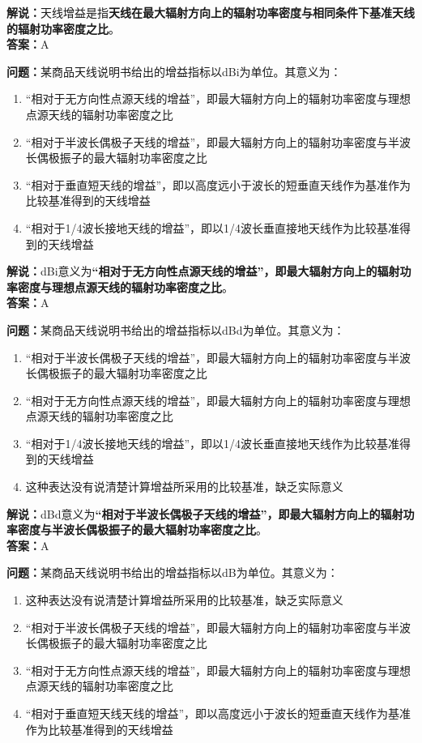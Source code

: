 \textbf{解说：}天线增益是指\textbf{天线在最大辐射方向上的辐射功率密度与相同条件下基准天线的辐射功率密度之比}。\\\textbf{答案：}A



\textbf{问题：}某商品天线说明书给出的增益指标以dBi为单位。其意义为：
\begin{enumerate}[label=\Alph*), leftmargin=1.5cm]
	\item “相对于无方向性点源天线的增益”，即最大辐射方向上的辐射功率密度与理想点源天线的辐射功率密度之比
	\item “相对于半波长偶极子天线的增益”，即最大辐射方向上的辐射功率密度与半波长偶极振子的最大辐射功率密度之比
	\item “相对于垂直短天线的增益”，即以高度远小于波长的短垂直天线作为基准作为比较基准得到的天线增益
	\item “相对于1/4波长接地天线的增益”，即以1/4波长垂直接地天线作为比较基准得到的天线增益
\end{enumerate}

\textbf{解说：}dBi意义为\textbf{“相对于无方向性点源天线的增益”，即最大辐射方向上的辐射功率密度与理想点源天线的辐射功率密度之比}。\\\textbf{答案：}A



\textbf{问题：}某商品天线说明书给出的增益指标以dBd为单位。其意义为：

\begin{enumerate}[label=\Alph*), leftmargin=1.5cm]
	\item “相对于半波长偶极子天线的增益”，即最大辐射方向上的辐射功率密度与半波长偶极振子的最大辐射功率密度之比
	\item “相对于无方向性点源天线的增益”，即最大辐射方向上的辐射功率密度与理想点源天线的辐射功率密度之比
	\item “相对于1/4波长接地天线的增益”，即以1/4波长垂直接地天线作为比较基准得到的天线增益
	\item 这种表达没有说清楚计算增益所采用的比较基准，缺乏实际意义
\end{enumerate}

\textbf{解说：}dBd意义为\textbf{“相对于半波长偶极子天线的增益”，即最大辐射方向上的辐射功率密度与半波长偶极振子的最大辐射功率密度之比}。\\\textbf{答案：}A



\textbf{问题：}某商品天线说明书给出的增益指标以dB为单位。其意义为：

\begin{enumerate}[label=\Alph*), leftmargin=1.5cm]
	\item 这种表达没有说清楚计算增益所采用的比较基准，缺乏实际意义
	\item “相对于半波长偶极子天线的增益”，即最大辐射方向上的辐射功率密度与半波长偶极振子的最大辐射功率密度之比
	\item “相对于无方向性点源天线的增益”，即最大辐射方向上的辐射功率密度与理想点源天线的辐射功率密度之比
	\item “相对于垂直短天线天线的增益”，即以高度远小于波长的短垂直天线作为基准作为比较基准得到的天线增益
\end{enumerate}

